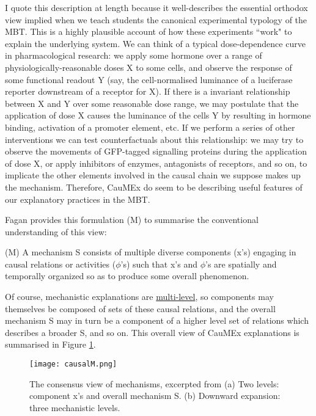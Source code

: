 I quote this description at length because it well-describes the essential orthodox view implied when we teach students the canonical experimental typology of the MBT. This is a highly plausible account of how these experiments ``work" to explain the underlying system. We can think of a typical dose-dependence curve in pharmacological research: we apply some hormone over a range of physiologically-reasonable doses X to some cells, and observe the response of some functional readout Y (say, the cell-normalised luminance of a luciferase reporter downstream of a receptor for X). If there is a invariant relationship between X and Y over some reasonable dose range, we may postulate that the application of dose X causes the luminance of the cells Y by resulting in hormone binding, activation of a promoter element, etc. If we perform a series of other interventions we can test counterfactuals about this relationship: we may try to observe the movements of GFP-tagged signalling proteins during the application of dose X, or apply inhibitors of enzymes, antagonists of receptors, and so on, to implicate the other elements involved in the causal chain we suppose makes up the mechanism. Therefore, CauMEx do seem to be describing useful features of our explanatory practices in the MBT.

Fagan provides this formulation (M) to summarise the conventional understanding of this view:

\begin{longquote}
(M) A mechanism S consists of multiple diverse components (x's) engaging in causal relations or activities ($\phi$'s) such that x's and $\phi$'s are 
spatially and temporally organized so as to produce some overall
phenomenon.
\cite[p.95]{Fagan2013}
\end{longquote}

Of course, mechanistic explanations are \hyperref[hierarchy]{multi-level}, so components may themselves be composed of sets of these causal relations, and the overall mechanism S may in turn be a component of a higher level set of relations which describes a broader S, and so on. This overall view of CauMEx explanations is summarised in Figure \ref{fig:CausalM}.

\begin{figure}
\texttt{[image: causalM.png]}
\centering
\caption{The consensus view of mechanisms, excerpted from \cite[p.96]{Fagan2013} (a) Two levels: component x’s and overall mechanism S.
(b) Downward expansion: three mechanistic levels.}
\label{fig:CausalM}
\end{figure}

